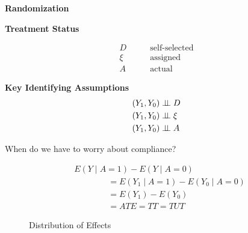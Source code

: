 \begin{frame}\begin{center}
\LARGE\textbf{Randomization}
\end{center}\end{frame}
\begin{frame}\textbf{Treatment Status}

\begin{align*}
D &\qquad \text{self-selected} \\
\xi &\qquad \text{assigned} \\
A &\qquad  \text{actual}
\end{align*}
\end{frame}
\begin{frame}\textbf{Key Identifying Assumptions}
\begin{align*}
(Y_1, Y_0) & \indep D \\
(Y_1, Y_0) & \indep \xi \\
(Y_1, Y_0) & \indep A
\end{align*}

When do we have to worry about compliance?

\end{frame}
\begin{frame}
\begin{align*}
& E(Y\mid A = 1) - E(Y\mid A = 0) \\
& \qquad\qquad = E(Y_1\mid A = 1) - E(Y_0\mid A = 0)  \tag{by full compliance} \\
& \qquad\qquad = E(Y_1) - E(Y_0)  \tag{by randomization} \\
& \qquad\qquad = ATE = TT = TUT
\end{align*}
\end{frame}
\begin{frame}
\begin{figure}\caption{Distribution of Effects}
\end{figure}
\end{frame}
